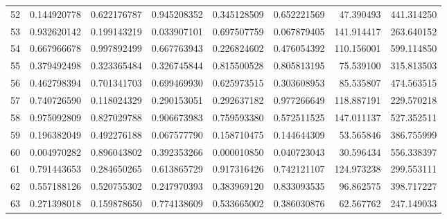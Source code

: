 \begin{longtable}{rrrrrrrr}
52 & 0.144920778 & 0.622176787 & 0.945208352 & 0.345128509 & 0.652221569 & 47.390493 & 441.314250 \\
53 & 0.932620142 & 0.199143219 & 0.033907101 & 0.697507759 & 0.067879405 & 141.914417 & 263.640152 \\
54 & 0.667966678 & 0.997892499 & 0.667763943 & 0.226824602 & 0.476054392 & 110.156001 & 599.114850 \\
55 & 0.379492498 & 0.323365484 & 0.326745844 & 0.815500528 & 0.805813195 & 75.539100 & 315.813503 \\
56 & 0.462798394 & 0.701341703 & 0.699469930 & 0.625973515 & 0.303608953 & 85.535807 & 474.563515 \\
57 & 0.740726590 & 0.118024329 & 0.290153051 & 0.292637182 & 0.977266649 & 118.887191 & 229.570218 \\
58 & 0.975092809 & 0.827029788 & 0.906673983 & 0.759593380 & 0.572511525 & 147.011137 & 527.352511 \\
59 & 0.196382049 & 0.492276188 & 0.067577790 & 0.158710475 & 0.144644309 & 53.565846 & 386.755999 \\
60 & 0.004970282 & 0.896043802 & 0.392353266 & 0.000010850 & 0.040723043 & 30.596434 & 556.338397 \\
61 & 0.791443653 & 0.284650265 & 0.613865729 & 0.917316426 & 0.742121107 & 124.973238 & 299.553111 \\
62 & 0.557188126 & 0.520755302 & 0.247970393 & 0.383969120 & 0.833093535 & 96.862575 & 398.717227 \\
63 & 0.271398018 & 0.159878650 & 0.774138609 & 0.533665002 & 0.386030876 & 62.567762 & 247.149033 \\
\bottomrule
\end{longtable}
